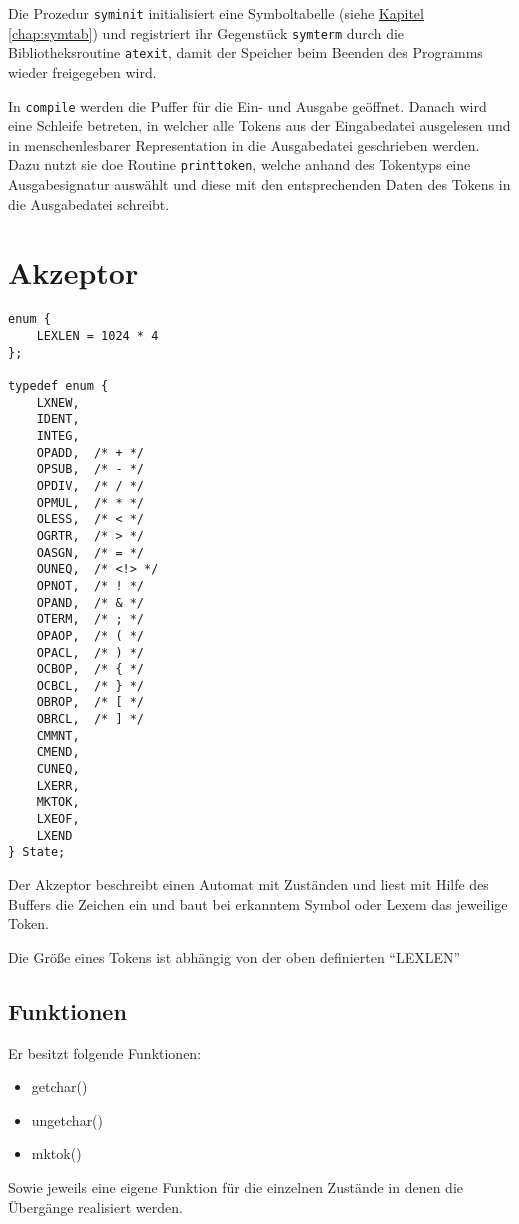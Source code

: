 Die Prozedur \texttt{syminit} initialisiert eine Symboltabelle (siehe \hyperref[chap:symtab]{Kapitel \ref{chap:symtab}})
und registriert ihr Gegenstück \texttt{symterm} durch die Bibliotheksroutine \texttt{atexit},
damit der Speicher beim Beenden des Programms wieder freigegeben wird.

In \texttt{compile} werden die Puffer für die Ein- und Ausgabe geöffnet.
Danach wird eine Schleife betreten,
in welcher alle Tokens aus der Eingabedatei ausgelesen
und in menschenlesbarer Representation in die Ausgabedatei geschrieben werden.
Dazu nutzt sie doe Routine \texttt{printtoken},
welche anhand des Tokentyps eine Ausgabesignatur auswählt
und diese mit den entsprechenden Daten des Tokens in die Ausgabedatei schreibt.

\section{Akzeptor}
\label{sec:scanner_acceptor}

\begin{lstlisting}
enum {
	LEXLEN = 1024 * 4
};

typedef enum {
	LXNEW,
	IDENT,
	INTEG,
	OPADD,	/* + */
	OPSUB,	/* - */
	OPDIV,	/* / */
	OPMUL,	/* * */
	OLESS,	/* < */
	OGRTR,	/* > */
	OASGN,	/* = */
	OUNEQ,	/* <!> */
	OPNOT,	/* ! */
	OPAND,	/* & */
	OTERM,	/* ; */
	OPAOP,	/* ( */
	OPACL,	/* ) */
	OCBOP,	/* { */
	OCBCL,	/* } */
	OBROP,	/* [ */
	OBRCL,	/* ] */
	CMMNT,
	CMEND,
	CUNEQ,
	LXERR,
	MKTOK,
	LXEOF,
	LXEND
} State;
\end{lstlisting}

Der Akzeptor beschreibt einen Automat mit Zuständen und liest mit Hilfe des Buffers die Zeichen ein und baut bei erkanntem Symbol oder Lexem das jeweilige Token.

Die Größe eines Tokens ist abhängig von der oben definierten ``LEXLEN''

\subsection{Funktionen}
\label{sec:acceptor}

Er besitzt folgende Funktionen:
\begin{itemize}
\item{getchar()}
\item{ungetchar()}
\item{mktok()}
\end{itemize}

Sowie jeweils eine eigene Funktion für die einzelnen Zustände in denen die Übergänge realisiert werden.

